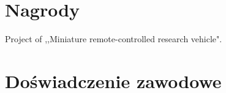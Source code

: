 \documentclass[letterpaper]{template/twentysecondcv} %
\begin{document}




\vspace{-0.25cm}
\section{Nagrody}

\begin{twentyshort} %
	 {Project of ,,Miniature remote-controlled research vehicle".}
\end{twentyshort}

\vspace{-0.25cm}
\section{Doświadczenie zawodowe}
\end{document}
